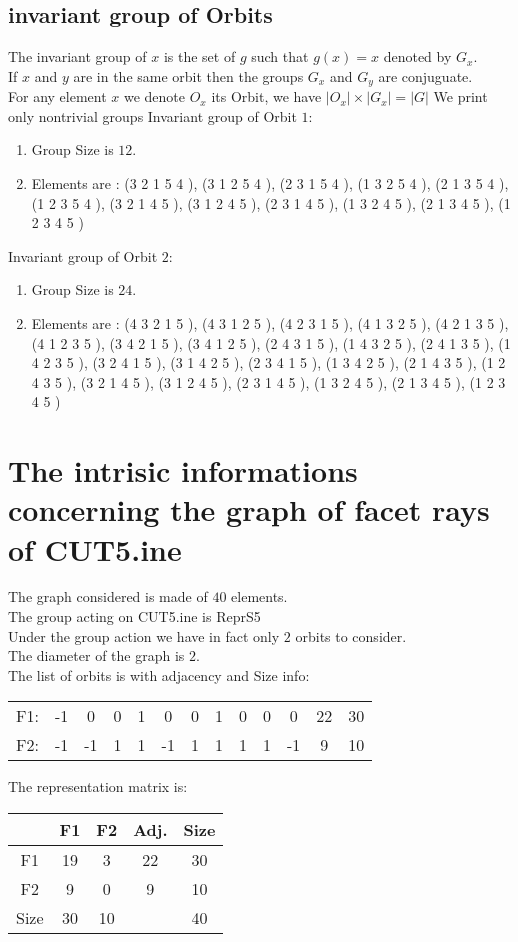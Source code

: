 \documentclass[12pt]{article}
\begin{document}
\subsection{invariant group of Orbits}
\noindent The invariant group of $x$ is the set of $g$ such that $g(x)=x$ denoted by $G_x$.\\
If $x$ and $y$ are in the same orbit then the groups $G_x$ and  $G_y$ are conjuguate.\\
For any element $x$ we denote $O_x$ its Orbit, we have $|O_x|\times |G_x|=|G|$
We print only nontrivial groups
Invariant group of Orbit $1$:
\begin{enumerate}
\item Group Size is $12$.
\item Elements are : (3 2 1 5 4  ), (3 1 2 5 4  ), (2 3 1 5 4  ), (1 3 2 5 4  ), (2 1 3 5 4  ), (1 2 3 5 4  ), (3 2 1 4 5  ), (3 1 2 4 5  ), (2 3 1 4 5  ), (1 3 2 4 5  ), (2 1 3 4 5  ), (1 2 3 4 5  )
\end{enumerate}
Invariant group of Orbit $2$:
\begin{enumerate}
\item Group Size is $24$.
\item Elements are : (4 3 2 1 5  ), (4 3 1 2 5  ), (4 2 3 1 5  ), (4 1 3 2 5  ), (4 2 1 3 5  ), (4 1 2 3 5  ), (3 4 2 1 5  ), (3 4 1 2 5  ), (2 4 3 1 5  ), (1 4 3 2 5  ), (2 4 1 3 5  ), (1 4 2 3 5  ), (3 2 4 1 5  ), (3 1 4 2 5  ), (2 3 4 1 5  ), (1 3 4 2 5  ), (2 1 4 3 5  ), (1 2 4 3 5  ), (3 2 1 4 5  ), (3 1 2 4 5  ), (2 3 1 4 5  ), (1 3 2 4 5  ), (2 1 3 4 5  ), (1 2 3 4 5  )
\end{enumerate}
\section{The intrisic informations concerning the graph of facet rays of CUT5.ine}
The graph considered is made of $40$ elements.\\
The group acting on CUT5.ine is ReprS5\\
Under the group action we have in fact only $2$ orbits to consider.\\
The diameter of the graph is $2$.\\
The list of orbits is with adjacency and Size info:
\begin{center}
\scriptsize
\begin{tabular}{ccccccccccc|c|c}
F1:&-1&0&0&1&0&0&1&0&0&0&22&30\\
F2:&-1&-1&1&1&-1&1&1&1&1&-1&9&10\\
\end{tabular}
\end{center}
The representation matrix is:
\begin{center}
\scriptsize
\begin{tabular}{|c|cc|c|c|}
\hline
&F1&F2&Adj.&Size\\
\hline
F1& 19& 3&22&30\\
F2& 9& 0&9&10\\
\hline
Size&30&10&&40\\
\hline
\end{tabular}
\end{center}
\end{document}
